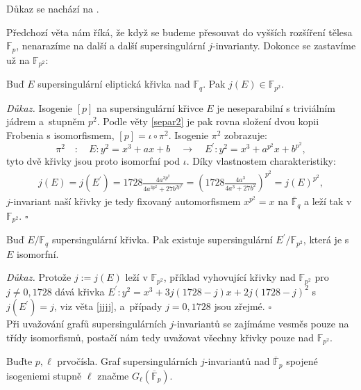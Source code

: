 \documentclass[12pt]{report}
\begin{document}
Důkaz se nachází na \cite[Cor. 4.40]{Washington}.

Předchozí věta nám říká, že když se budeme přesouvat do vyšších rozšíření tělesa $\mathbb{F}_p$, nenarazíme na další a další supersingulární $j$-invarianty. Dokonce se zastavíme už na $\mathbb{F}_{p^2}$:

\begin{veta}
Buď $E$ supersingulární eliptická křivka nad $\mathbb{F}_q$. Pak $j(E) \in \mathbb{F}_{p^2}$.
\end{veta}
\noindent \textit{Důkaz.} Isogenie $[p]$ na supersingulární křivce $E$ je neseparabilní s triviálním jádrem a~stupněm $p^2$. Podle věty \ref{separ2} je pak rovna složení dvou kopii Frobenia s isomorfismem, $[p] = \iota \circ \pi ^2$. Isogenie $\pi^2$ zobrazuje:
\begin{equation*}
\pi^2 \quad : \quad E: y^2 = x^3+ax+b  \quad \longrightarrow \quad E^\prime : y^2 = x^3 + a^{p^2}x + b^{p^2},
\end{equation*}
tyto dvě křivky jsou proto isomorfní pod $\iota$. Díky vlastnostem charakteristiky:
\begin{align*}
 j(E) = j(E^\prime) = 1728 \frac{4 a^{3 p^2}}{4 a^{3 p^2} + 27 b^{2 p^2}} = \left( 1728 \frac{4 a^3}{4a^3+27b^2} \right)^{p^2} = j(E)^{p^2},
\end{align*}
$j$-invariant naší křivky je tedy fixovaný automorfismem $x^{p^2} = x$ na $\overline{\mathbb{F}}_q$ a leží tak v $\mathbb{F}_{p^2}$. \hfill $\square$\\

\begin{dusledek}\label{Fp2}
Buď $E/\mathbb{F}_q$ supersingulární křivka. Pak existuje supersingulární $E^\prime/\mathbb{F}_{p^2}$, která je s $E$ isomorfní.
\end{dusledek}
\noindent \textit{Důkaz.} Protože $j := j(E)$ leží v $\mathbb{F}_{p^2}$, příklad vyhovující křivky nad $\mathbb{F}_{p^2}$ pro $j \neq 0,1728$ dává křivka $E^\prime : y^2 = x^3 +3j(1728-j)x + 2j(1728-j)^2$ s $j(E^\prime) = j$, viz věta \ref{jjjj}, a~případy $j = 0,1728$ jsou zřejmé. \hfill $\square$\\

Při uvažování grafů supersingulárních $j$-invariantů se zajímáme vesměs pouze na třídy isomorfismů, postačí nám tedy uvažovat všechny křivky pouze nad $\mathbb{F}_{p^2}$.

\begin{znaceni}
Buďte $p, \ell$ prvočísla. Graf supersingulárních $j$-invariantů nad $\overline{\mathbb{F}}_p$ spojené isogeniemi stupně $\ell$ značme $G_{\ell} (\overline{\mathbb{F}}_p)$.
\end{znaceni}
\end{document}
